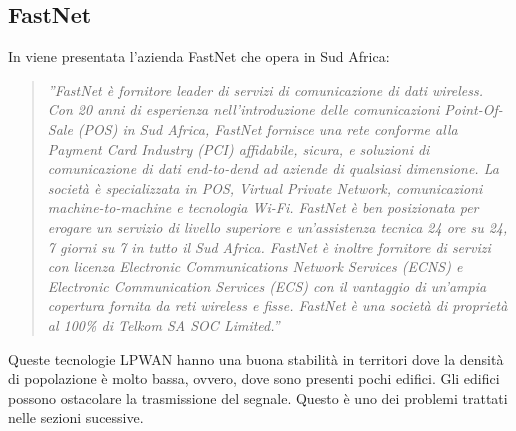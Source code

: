 \documentclass[a4paper]{report} %
\begin{document}
\subsection{FastNet}
In \cite{art:rif.26} viene presentata l'azienda FastNet che opera in Sud Africa:
\begin{quote}
	\textit{''FastNet è fornitore leader di servizi di comunicazione di dati wireless. Con 20 anni di esperienza nell'introduzione delle comunicazioni Point-Of-Sale (POS) in Sud Africa, FastNet fornisce una rete conforme alla Payment Card Industry (PCI) affidabile, sicura, e soluzioni di comunicazione di dati end-to-dend ad aziende di qualsiasi dimensione. La società è specializzata in POS, Virtual Private Network, comunicazioni machine-to-machine e tecnologia Wi-Fi.
	FastNet è ben posizionata per erogare un servizio di livello superiore e un'assistenza tecnica 24 ore su 24, 7 giorni su 7 in tutto il Sud Africa. FastNet è inoltre fornitore di servizi con licenza Electronic Communications Network Services (ECNS) e Electronic Communication Services (ECS) con il vantaggio di un'ampia copertura fornita da reti wireless e fisse.
	FastNet è una società di proprietà al 100\% di Telkom SA SOC Limited.''}
\end{quote}
Queste tecnologie LPWAN hanno una buona stabilità in territori dove la densità di popolazione è molto bassa, ovvero, dove sono presenti pochi edifici. Gli edifici possono ostacolare la trasmissione del segnale. Questo è uno dei problemi trattati nelle sezioni sucessive.
\end{document}
